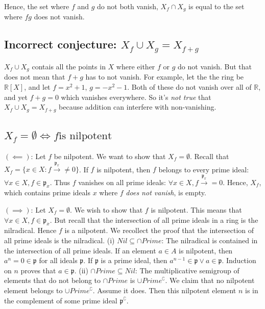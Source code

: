 \documentclass{book}
\newcommand{\frakp}{\ensuremath{\mathfrak{p}}}
\renewcommand{\c}{\complement} %
\theoremstyle{definition}
\begin{document}
Hence, the set where $f$ and $g$ do not both vanish, $X_f \cap X_g$ is equal
to the set where $fg$ does not vanish.

\subsection{\textbf{Incorrect conjecture}: $X_f \cup X_g = X_{f + g}$}
$X_f \cup X_g$ contais all the points in $X$ where either $f$ or $g$ do not vanish.
But that does not mean that $f + g$ has to not vanish. For example, let the
the ring be $\mathbb R[X]$, and let $f = x^2+1$, $g = -x^2-1$. Both of these 
do not vanish over all of $\mathbb R$, and yet $f + g = 0$ which vanishes
everywhere. So it's \emph{not true} that $X_f \cup X_g = X_{f + g}$ because addition
can interfere with non-vanishing.

\subsection{$X_f = \emptyset \iff f \text{is nilpotent}$}
$(\impliedby)$: Let $f$ be nilpotent. We want to show that $X_f = \emptyset$.
Recall that $X_f = \{ x \in X: f \xrightarrow{\frakp_x} \neq 0 \}$. If
$f$ is nilpotent, then $f$ belongs to every prime ideal: $\forall x \in X, f \in \frakp_x$.
Thus $f$ vanishes on all prime ideals: $\forall x \in X, f \xrightarrow{\frakp_x} = 0$.
Hence, $X_f$, which contains prime ideals $x$ where $f$ \emph{does not vanish}, is empty.

$(\implies)$: Let  $X_f = \emptyset$. We wish to show that $f$ is nilpotent.
This means that $\forall x \in X, f \in \frakp_x$. But recall that the intersection
of all prime ideals in a ring is the nilradical. Hence $f$ is a nilpotent. 
We recollect the proof that the intersection of all prime ideals is the
nilradical. (i) $Nil \subseteq \cap Prime$: The nilradical is contained in the intersection of all prime
ideals. If an element $a \in A$ is nilpotent, then $a^n = 0 \in \frakp$ for all ideals $\frakp$.
If $\frakp$ is a prime ideal, then $a^{n-1} \in \frakp \lor a \in \frakp$. Induction
on $n$ proves that $a \in \frakp$. (ii) $\cap Prime \subseteq Nil$: The multiplicative
semigroup of elements that do not belong to $\cap Prime$ is $\cup Prime^\c$.
We claim that no nilpotent element belongs to $\cup Prime^\c$. Assume
it does. Then this nilpotent element $n$ is in the complement of
some prime ideal $\frakp^\c$.
\end{document}
